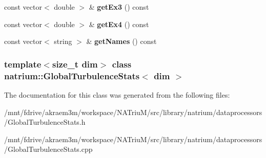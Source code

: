 \begin{DoxyCompactItemize}
\item 
\hypertarget{classnatrium_1_1GlobalTurbulenceStats_ae594e55082c5409c2d3e6d14983b3c46}{
const vector$<$ double $>$ \& {\bfseries getEx3} () const }
\label{classnatrium_1_1GlobalTurbulenceStats_ae594e55082c5409c2d3e6d14983b3c46}

\item 
\hypertarget{classnatrium_1_1GlobalTurbulenceStats_a2f029e7b38e4ab63c1c4d42ba35a1efc}{
const vector$<$ double $>$ \& {\bfseries getEx4} () const }
\label{classnatrium_1_1GlobalTurbulenceStats_a2f029e7b38e4ab63c1c4d42ba35a1efc}

\item 
\hypertarget{classnatrium_1_1GlobalTurbulenceStats_aa82cdbd5d3f29b8df1cd30b8f8d98d41}{
const vector$<$ string $>$ \& {\bfseries getNames} () const }
\label{classnatrium_1_1GlobalTurbulenceStats_aa82cdbd5d3f29b8df1cd30b8f8d98d41}

\end{DoxyCompactItemize}
\subsubsection*{template$<$size\_\-t dim$>$ class natrium::GlobalTurbulenceStats$<$ dim $>$}



The documentation for this class was generated from the following files:\begin{DoxyCompactItemize}
\item 
/mnt/fdrive/akraem3m/workspace/NATriuM/src/library/natrium/dataprocessors/GlobalTurbulenceStats.h\item 
/mnt/fdrive/akraem3m/workspace/NATriuM/src/library/natrium/dataprocessors/GlobalTurbulenceStats.cpp\end{DoxyCompactItemize}
